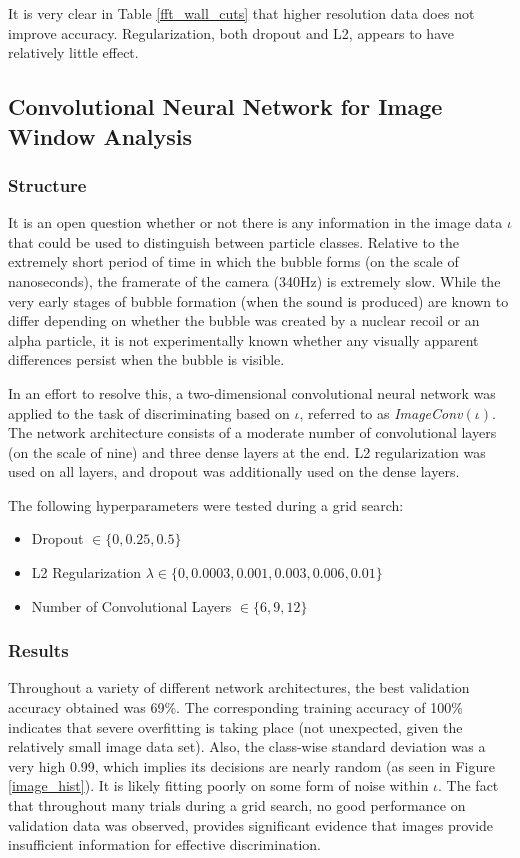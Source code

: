 \documentclass[10pt]{article}
\begin{document}
It is very clear in Table \ref{fft_wall_cuts} that higher resolution data does not improve accuracy. Regularization, both dropout and L2, appears to have relatively little effect.

\subsection{Convolutional Neural Network for Image Window Analysis}

\subsubsection{Structure}

It is an open question whether or not there is any information in the image data $\iota$ that could be used to distinguish between particle classes. Relative to the extremely short period of time in which the bubble forms (on the scale of nanoseconds), the framerate of the camera (340Hz) is extremely slow. While the very early stages of bubble formation (when the sound is produced) are known to differ depending on whether the bubble was created by a nuclear recoil or an alpha particle, it is not experimentally known whether any visually apparent differences persist when the bubble is visible.

In an effort to resolve this, a two-dimensional convolutional neural network was applied to the task of discriminating based on $\iota$, referred to as {\it ImageConv}$(\iota)$. The network architecture consists of a moderate number of convolutional layers (on the scale of nine) and three dense layers at the end. L2 regularization was used on all layers, and dropout was additionally used on the dense layers.

The following hyperparameters were tested during a grid search:
\begin{itemize}
    \item Dropout $\in \{0, 0.25, 0.5\}$
    \item L2 Regularization $\lambda \in \{0, 0.0003, 0.001, 0.003, 0.006, 0.01\}$
    \item Number of Convolutional Layers $\in \{6, 9, 12\}$
\end{itemize}

\subsubsection{Results}

Throughout a variety of different network architectures, the best validation accuracy obtained was 69\%. The corresponding training accuracy of 100\% indicates that severe overfitting is taking place (not unexpected, given the relatively small image data set). Also, the class-wise standard deviation was a very high 0.99, which implies its decisions are nearly random (as seen in Figure \ref{image_hist}). It is likely fitting poorly on some form of noise within $\iota$. The fact that throughout many trials during a grid search, no good performance on validation data was observed, provides significant evidence that images provide insufficient information for effective discrimination.
\end{document}
